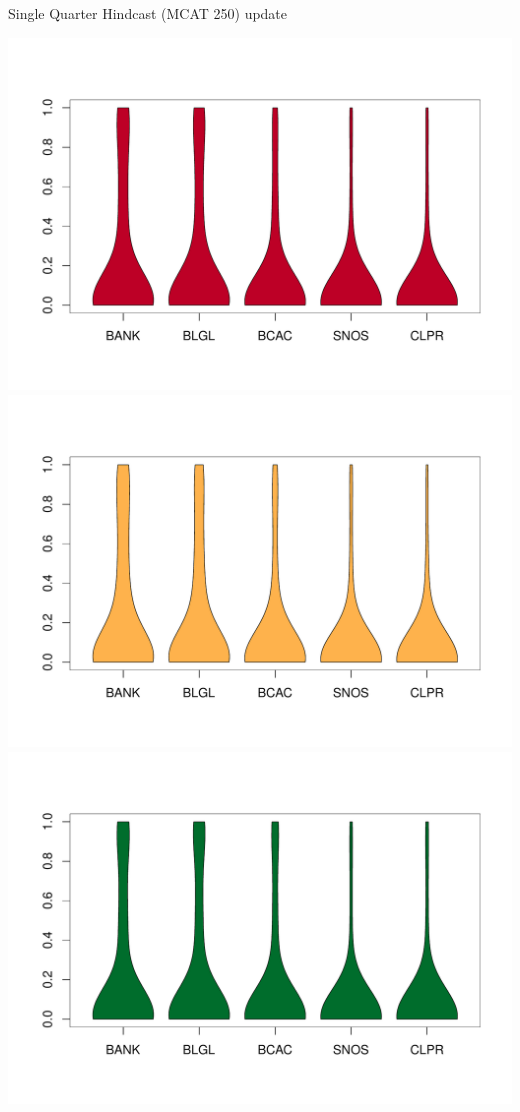 \documentclass[ xcolor = pdftex, dvipsnames, table ]{beamer}
\begin{document}
\begin{frame}{Single Quarter Hindcast (MCAT 250) {\color{red} update}}
\begin{minipage}{0.29\textwidth}
\includegraphics[height=0.36\textheight]{../pictures/vioStarOSBTWL.pdf}\\
\vspace*{-1.3cm}
\includegraphics[height=0.36\textheight]{../pictures/vioStarOLATWL.pdf}\\
\vspace*{-1.3cm}
\includegraphics[height=0.36\textheight]{../pictures/vioStarOSDTWL.pdf}
\end{minipage}
\end{frame}
\end{document}
